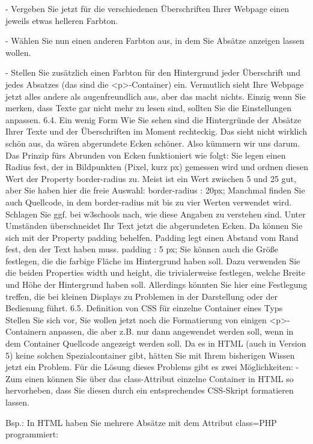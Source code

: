 -	Vergeben Sie jetzt für die verschiedenen Überschriften Ihrer Webpage einen jeweils etwas helleren Farbton.

-	Wählen Sie nun einen anderen Farbton aus, in dem Sie Absätze anzeigen lassen wollen.

-	Stellen Sie zusätzlich einen Farbton für den Hintergrund jeder Überschrift und jedes Absatzes (das sind die <p>-Container) ein.
Vermutlich sieht Ihre Webpage jetzt alles andere als augenfreundlich aus, aber das macht nichts. Einzig wenn Sie merken, dass Texte gar nicht mehr zu lesen sind, sollten Sie die Einstellungen anpassen.
6.4.	Ein wenig Form
Wie Sie sehen sind die Hintergründe der Absätze Ihrer Texte und der Überschriften im Moment rechteckig. Das sieht nicht wirklich schön aus, da wären abgerundete Ecken schöner. Also kümmern wir uns darum.
Das Prinzip fürs Abrunden von Ecken funktioniert wie folgt: Sie legen einen Radius fest, der in Bildpunkten (Pixel, kurz px) gemessen wird und ordnen diesen Wert der Property border-radius zu. Meist ist ein Wert zwischen 5 und 25 gut, aber Sie haben hier die freie Auswahl:
border-radius : 20px;
Manchmal finden Sie auch Quellcode, in dem border-radius mit bis zu vier Werten verwendet wird. Schlagen Sie ggf. bei w3schools nach, wie diese Angaben zu verstehen sind.
Unter Umständen überschneidet Ihr Text jetzt die abgerundeten Ecken. Da können Sie sich mit der Property padding behelfen. Padding legt einen Abstand vom Rand fest, den der Text haben muss.
padding : 5 px;
Sie können auch die Größe festlegen, die die farbige Fläche im Hintergrund haben soll. Dazu verwenden Sie die beiden Properties width und height, die trivialerweise festlegen, welche Breite und Höhe der Hintergrund haben soll. Allerdings könnten Sie hier eine Festlegung treffen, die bei kleinen Displays zu Problemen in der Darstellung oder der Bedienung führt.
6.5.	Definition von CSS für einzelne Container eines Typs
Stellen Sie sich vor, Sie wollen jetzt noch die Formatierung von einigen <p>-Containern anpassen, die aber z.B. nur dann angewendet werden soll, wenn in dem Container Quellcode angezeigt werden soll. Da es in HTML (auch in Version 5) keine solchen Spezialcontainer gibt, hätten Sie mit Ihrem bisherigen Wissen jetzt ein Problem.
Für die Lösung dieses Problems gibt es zwei Möglichkeiten:
-	Zum einen können Sie über das class-Attribut einzelne Container in HTML so hervorheben, dass Sie diesen durch ein entsprechendes CSS-Skript formatieren lassen.

Bsp.: In HTML haben Sie mehrere Absätze mit dem Attribut class=PHP programmiert: 

